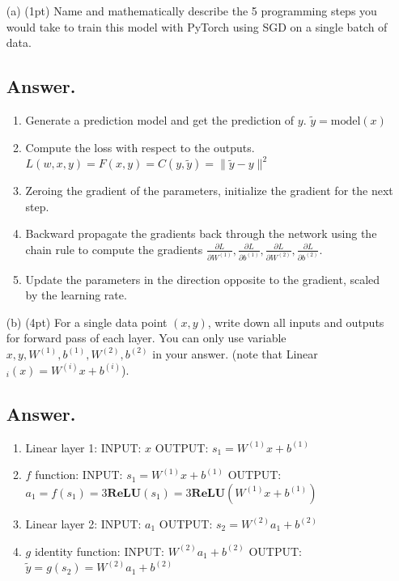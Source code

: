 \documentclass{article}
\begin{document}
\begin{itemize}
    \item[(a)] (1pt) Name and mathematically describe the 5 programming steps you would take to train this model with PyTorch using SGD on a single batch of data.
    \subsection*{Answer.}
    \begin{enumerate}
    \item Generate a prediction model and get the prediction of $y$.  $\tilde{y} = \text{model}(x)$
    \item Compute the loss with respect to the outputs. $L(w, x, y) = F(x, y) = C(y, \tilde{y}) = \|\tilde{y} - y\|^2$
    \item  Zeroing the gradient of the parameters, initialize the gradient for the next step. 
    \item Backward propagate the gradients back through the network using the chain rule to compute the gradients \(\frac{\partial L}{\partial W^{(1)}}, \frac{\partial L}{\partial b^{(1)}}, \frac{\partial L}{\partial W^{(2)}}, \frac{\partial L}{\partial b^{(2)}}\).
    \item Update the parameters in the direction opposite to the gradient, scaled by the learning rate.
    \end{enumerate}
    
    \item[(b)] (4pt) For a single data point $(x, y)$, write down all inputs and outputs for forward pass of each layer. You can only use variable $x, y, W^{(1)}, b^{(1)}, W^{(2)}, b^{(2)}$ in your answer. (note that Linear$_i(x) = W^{(i)}x + b^{(i)}$).

    \subsection*{Answer.}
    \begin{enumerate}
    \item Linear layer 1: INPUT: $x$ OUTPUT: $s_1 = W^{(1)}x + b^{(1)}$ 
    \item $f$ function: INPUT: $s_1 = W^{(1)}x + b^{(1)}$ OUTPUT: $a_1 = f(s_1) = 3\textbf{ReLU}(s_1) = 3\textbf{ReLU}(W^{(1)}x + b^{(1)}) $
    \item Linear layer 2: INPUT: $a_1$ OUTPUT: $s_2 = W^{(2)}a_1 + b^{(2)}$
    \item $g$ identity function: INPUT: $W^{(2)}a_1 + b^{(2)}$ OUTPUT: $\tilde{y} = g(s_2) = W^{(2)}a_1 + b^{(2)}$
    \end{enumerate}
    

\end{itemize}
\end{document}
